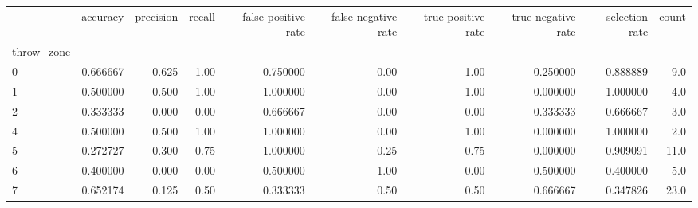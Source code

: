 \begin{tabular}{lrrrrrrrrr}
\toprule
{} &  accuracy &  precision &  recall &  false positive rate &  false negative rate &  true positive rate &  true negative rate &  selection rate &  count \\
throw\_zone &           &            &         &                      &                      &                     &                     &                 &        \\
\midrule
0          &  0.666667 &      0.625 &    1.00 &             0.750000 &                 0.00 &                1.00 &            0.250000 &        0.888889 &    9.0 \\
1          &  0.500000 &      0.500 &    1.00 &             1.000000 &                 0.00 &                1.00 &            0.000000 &        1.000000 &    4.0 \\
2          &  0.333333 &      0.000 &    0.00 &             0.666667 &                 0.00 &                0.00 &            0.333333 &        0.666667 &    3.0 \\
4          &  0.500000 &      0.500 &    1.00 &             1.000000 &                 0.00 &                1.00 &            0.000000 &        1.000000 &    2.0 \\
5          &  0.272727 &      0.300 &    0.75 &             1.000000 &                 0.25 &                0.75 &            0.000000 &        0.909091 &   11.0 \\
6          &  0.400000 &      0.000 &    0.00 &             0.500000 &                 1.00 &                0.00 &            0.500000 &        0.400000 &    5.0 \\
7          &  0.652174 &      0.125 &    0.50 &             0.333333 &                 0.50 &                0.50 &            0.666667 &        0.347826 &   23.0 \\
\bottomrule
\end{tabular}
